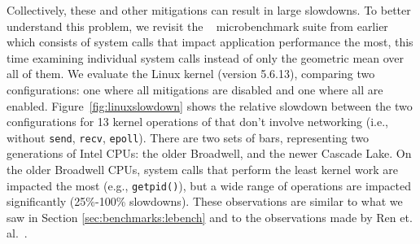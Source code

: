 Collectively, these and other mitigations can result in large
slowdowns. 
To better understand this problem, we revisit the 
\bench~\cite{lebench} microbenchmark suite from earlier which
consists of system calls
that impact application
performance the most, this time examining individual system calls instead of only the geometric mean over all of them.
We evaluate the Linux kernel (version 5.6.13),
comparing two configurations: one where all mitigations are disabled
and one where all are enabled. Figure~\ref{fig:linuxslowdown} shows
the relative slowdown between the two configurations for 13 kernel
operations of \bench that don't involve networking (i.e., without
\texttt{send}, \texttt{recv}, \texttt{epoll}).  There are two sets of
bars, representing two generations of Intel CPUs: the older Broadwell,
and the newer Cascade Lake.  On the older Broadwell CPUs,
system calls that perform the least kernel work are impacted the most
(e.g., \texttt{getpid()}), but a wide range of operations are impacted
significantly (25\%-100\% slowdowns). These observations are similar
to what we saw in Section \ref{sec:benchmarks:lebench} and to the observations made by Ren et. al.~\cite{lebench}.



